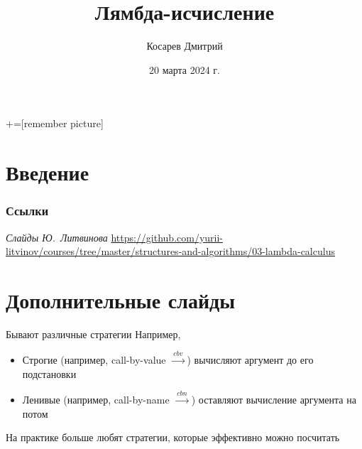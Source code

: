 \documentclass[aspectratio=169
  , xcolor={svgnames}
  , hyperref=
      { colorlinks
      , urlcolor=DarkBlue
      }
  , russian  %
  ]{beamer}
\title[]{Лямбда-исчисление}
\author{Косарев Дмитрий}
\date{20 марта 2024 г.}
\newcommand{\xarr}[1]{\xrightarrow{\ #1\ }}
\newcommand{\cbv}{\xarr{cbv}}
\newcommand{\cbn}{\xarr{cbn}}
\begin{document}
\maketitle

+=[remember picture]

\everymath{\displaystyle}





\section*{Введение}


\begin{frame}%
  \frametitle<presentation>{Ссылки}
  \begin{thebibliography}{10}
      {\em Слайды Ю.~Литвинова} \newblock\url{https://github.com/yurii-litvinov/courses/tree/master/structures-and-algorithms/03-lambda-calculus}
  \end{thebibliography}
\end{frame}


%

\section{Дополнительные слайды}


\begin{frame}{Бывают различные стратегии}
Например,
\begin{itemize}
\item Строгие (например, call-by-value $\cbv$) вычисляют аргумент до его подстановки
\item Ленивые (например, call-by-name $\cbn$)  оставляют вычисление аргумента на потом
\end{itemize}


На практике больше любят стратегии, которые эффективно можно посчитать
\end{frame}
\end{document}
